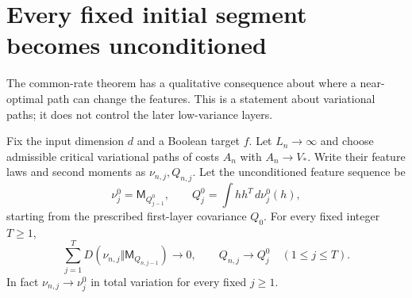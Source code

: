 \section{Every fixed initial segment becomes unconditioned}
\label{sec:critical-initial-layers}

The common-rate theorem has a qualitative consequence about where a
near-optimal path can change the features. This is a statement about
variational paths; it does not control the later low-variance layers.

\begin{proposition}
\label{prop:critical-unconditioned-prefix}
Fix the input dimension $d$ and a Boolean target $f$. Let $L_n\to\infty$
and choose admissible critical variational paths of costs $A_n$ with
$A_n\to V_*$. Write their feature laws and second moments as
$\nu_{n,j},Q_{n,j}$. Let the unconditioned feature sequence be
\[
 \nu_j^0=\mathsf M_{Q_{j-1}^0},\qquad
 Q_j^0=\int hh^T\,d\nu_j^0(h),
\]
starting from the prescribed first-layer covariance $Q_0$.
For every fixed integer $T\ge1$,
\[
 \sum_{j=1}^T
 D(\nu_{n,j}\Vert\mathsf M_{Q_{n,j-1}})\longrightarrow0,
 \qquad Q_{n,j}\longrightarrow Q_j^0\quad(1\le j\le T).
\]
In fact $\nu_{n,j}\to\nu_j^0$ in total variation for every fixed
$j\ge1$.
\end{proposition}

